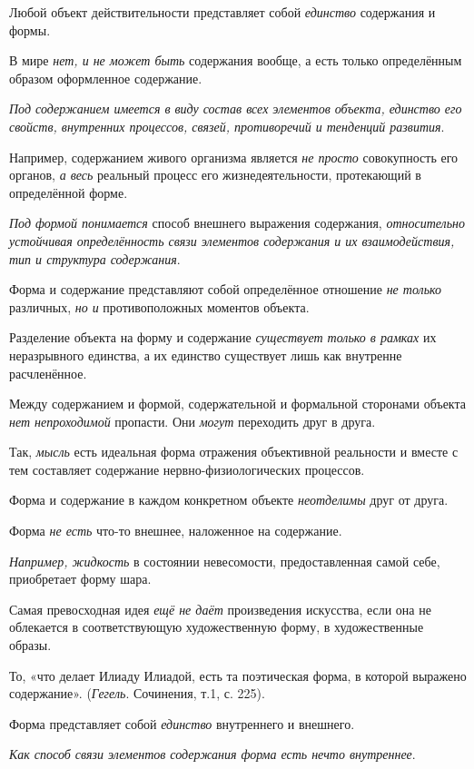 \documentclass[a4paper,14pt,russian]{extreport}
\begin{document}
Любой объект действительности представляет собой \emph{единство} содержания и формы.

В мире \emph{нет, и не может быть} содержания вообще, а есть только определённым образом оформленное содержание.

\emph{Под содержанием имеется в виду состав всех элементов объекта, единство его свойств, внутренних процессов, связей, противоречий и тенденций развития}.

Например, содержанием живого организма является \emph{не просто} совокупность его органов, \emph{а весь} реальный процесс его жизнедеятельности, протекающий в определённой форме.

\emph{Под формой понимается} способ внешнего выражения содержания, \emph{относительно устойчивая определённость связи элементов содержания и их взаимодействия, тип и структура содержания}.

Форма и содержание представляют собой определённое отношение \emph{не только} различных, \emph{но и} противоположных моментов объекта.

Разделение объекта на форму и содержание \emph{существует только в рамках} их неразрывного единства, а их единство существует лишь как внутренне расчленённое.

Между содержанием и формой, содержательной и формальной сторонами объекта \emph{нет непроходимой} пропасти. Они \emph{могут} переходить друг в друга.

Так, \emph{мысль} есть идеальная форма отражения объективной реальности и вместе с тем составляет содержание нервно-физиологических процессов.

Форма и содержание в каждом конкретном объекте \emph{неотделимы} друг от друга.

Форма \emph{не есть} что-то внешнее, наложенное на содержание.

\emph{Например, жидкость} в состоянии невесомости, предоставленная самой себе, приобретает форму шара.

Самая превосходная идея \emph{ещё не даёт} произведения искусства, если она не облекается в соответствующую художественную форму, в художественные образы.

То, «что делает Илиаду Илиадой, есть та поэтическая форма, в которой выражено содержание». (\emph{Гегель}. Сочинения, т.1, с. 225).

Форма представляет собой \emph{единство} внутреннего и внешнего.

\emph{Как способ связи элементов содержания форма есть нечто внутреннее}.
\end{document}

